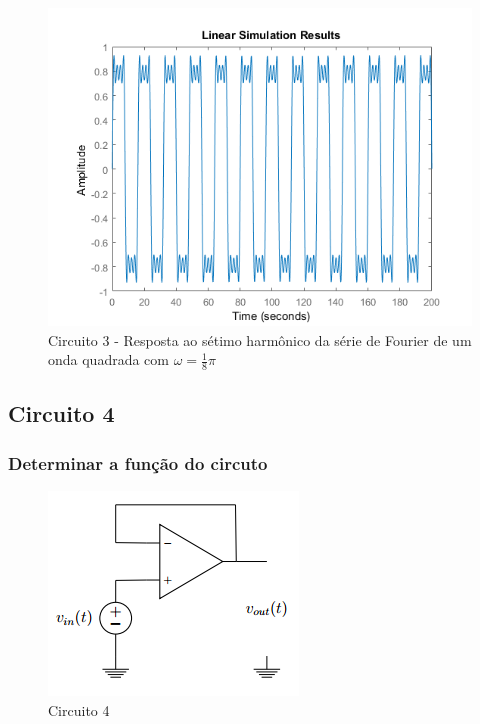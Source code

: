 \documentclass[a4paper, 12pt]{article}
\begin{document}
			\begin{figure}[!ht]
				\centering
				\includegraphics[scale=0.68]{img/1m_circ3.png}
				\caption{Circuito 3 - Resposta ao sétimo harmônico da série de Fourier de um onda quadrada com $\omega = \frac{1}{8}\pi$}
			\end{figure}
		\subsection{Circuito 4}
			\subsubsection{Determinar a função do circuto}
			\begin{figure}[!ht]
				\centering
				\includegraphics{img/circuito4.png}
				\caption{Circuito 4}
			\end{figure}
\end{document}
